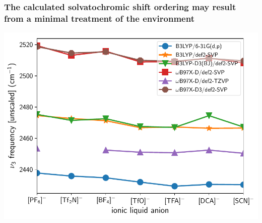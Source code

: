 \documentclass[%
    xcolor=usenames,dvipsnames,svgnames%
]{beamer}
\newenvironment{nscenter}
 {\parskip=0pt\par\nopagebreak\centering}
 {\par\noindent\ignorespacesafterend}
\begin{document}
\begin{frame}
  \frametitle{The calculated solvatochromic shift ordering may result from a minimal treatment of the environment}
  \begin{nscenter}
    \includegraphics[width=\linewidth,keepaspectratio]{./figures/updated_methods.pdf}
  \end{nscenter}
\end{frame}
\end{document}
